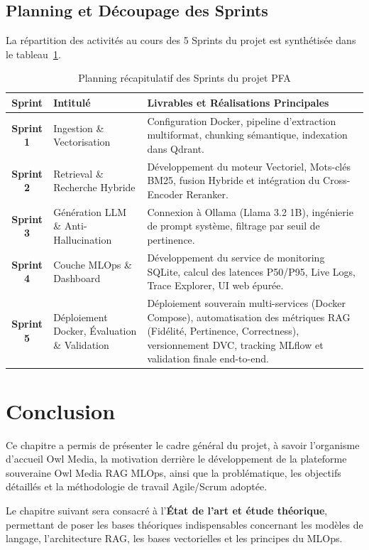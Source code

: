 \subsection{Planning et Découpage des Sprints}
La répartition des activités au cours des 5 Sprints du projet est synthétisée dans le tableau~\ref{tab:planning_sprints}.

\begin{table}[h!]
\centering
\caption{Planning récapitulatif des Sprints du projet PFA}
\label{tab:planning_sprints}
\begin{tabular}{|c|p{4cm}|p{8.5cm}|}
\hline
\textbf{Sprint} & \textbf{Intitulé} & \textbf{Livrables et Réalisations Principales} \\ \hline
\textbf{Sprint 1} & Ingestion \& Vectorisation & Configuration Docker, pipeline d'extraction multiformat, chunking sémantique, indexation dans Qdrant. \\ \hline
\textbf{Sprint 2} & Retrieval \& Recherche Hybride & Développement du moteur Vectoriel, Mots-clés BM25, fusion Hybride et intégration du Cross-Encoder Reranker. \\ \hline
\textbf{Sprint 3} & Génération LLM \& Anti-Hallucination & Connexion à Ollama (Llama 3.2 1B), ingénierie de prompt système, filtrage par seuil de pertinence. \\ \hline
\textbf{Sprint 4} & Couche MLOps \& Dashboard & Développement du service de monitoring SQLite, calcul des latences P50/P95, Live Logs, Trace Explorer, UI web épurée. \\ \hline
\textbf{Sprint 5} & Déploiement Docker, Évaluation \& Validation & Déploiement souverain multi-services (Docker Compose), automatisation des métriques RAG (Fidélité, Pertinence, Correctness), versionnement DVC, tracking MLflow et validation finale end-to-end. \\ \hline
\end{tabular}
\end{table}

\section{Conclusion}
Ce chapitre a permis de présenter le cadre général du projet, à savoir l'organisme d'accueil Owl Media, la motivation derrière le développement de la plateforme souveraine Owl Media RAG MLOps, ainsi que la problématique, les objectifs détaillés et la méthodologie de travail Agile/Scrum adoptée. 

Le chapitre suivant sera consacré à l'\textbf{État de l'art et étude théorique}, permettant de poser les bases théoriques indispensables concernant les modèles de langage, l'architecture RAG, les bases vectorielles et les principes du MLOps.
